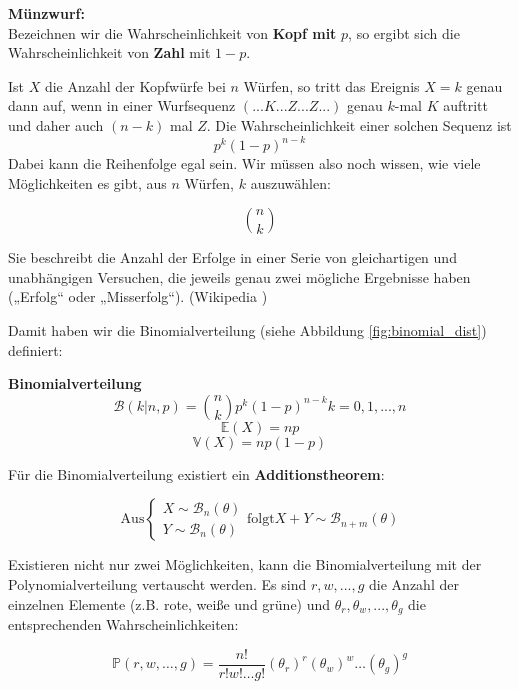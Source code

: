 {    \begin{bsp}\textbf{Münzwurf:}\\ 
    Bezeichnen wir die Wahrscheinlichkeit von \textbf{Kopf mit} $p$, so ergibt sich die Wahrscheinlichkeit von 
    \textbf{Zahl} mit $1-p$.

    Ist $X$ die Anzahl der Kopfwürfe bei $n$ Würfen, so tritt das Ereignis $X=k$ genau dann auf, wenn in einer
    Wurfsequenz $(... K ... Z ... Z ...)$ genau $k$-mal $K$ auftritt und daher auch $(n-k)$ mal $Z$. 
    Die Wahrscheinlichkeit einer solchen Sequenz ist 
    \[p^{k}\left(1-p\right)^{n-k}\]
    Dabei kann die Reihenfolge egal sein. Wir müssen also noch wissen, wie viele Möglichkeiten es gibt, 
    aus $n$ Würfen, $k$ auszuwählen:

    \[\binom{n}{k}\]
    \end{bsp}

    Sie beschreibt die Anzahl der Erfolge in einer Serie von gleichartigen und unabhängigen Versuchen, die jeweils genau zwei mögliche Ergebnisse haben („Erfolg“ oder „Misserfolg“). (Wikipedia \cite{wiki:003})

    Damit haben wir die Binomialverteilung (siehe Abbildung \ref{fig:binomial_dist}) definiert:
    \begin{definition}\textbf{Binomialverteilung}
    \[
    \mathcal B\left(k|n,p\right)=
    \binom{n}{k}p^{k}\left(1-p\right)^{n-k}k=0,1,...,n
    \]
    \[\mathbb E\left(X\right)=np\]
    \[\mathbb V\left(X\right)=np(1-p)\]
    \end{definition}

    Für die Binomialverteilung existiert ein \textbf{Additionstheorem}:

    \[\text{Aus}
        \begin{cases}X\sim\mathcal B_n(\theta)\\Y\sim\mathcal B_n(\theta)\end{cases} 
        \text{folgt}X+Y\sim\mathcal B_{n+m}(\theta)\]

    Existieren nicht nur zwei Möglichkeiten, kann die Binomialverteilung mit der Polynomialverteilung
    vertauscht werden. Es sind $r,w,... ,g$ die Anzahl der einzelnen Elemente (z.B. rote, weiße und grüne) und 
    $\theta_{r},\theta_{w},...,\theta_{g}$ die entsprechenden Wahrscheinlichkeiten:

    \[
    \mathbb P\left(r,w,\ldots ,g\right)=
        \frac{n!}{r!w!\ldots g!}\left(\theta_{r}\right)^{r}\left(\theta_{w}\right)^{w}\ldots \left(\theta_{g}\right)^{g}
    \]

}
